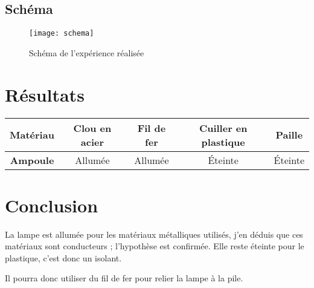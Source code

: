 \documentclass[11pt,a4paper]{article}
\begin{document}
	\subsection{Schéma}
	
		\begin{figure}[h!]
			\begin{center}
				\texttt{[image: schema]}
			\end{center}
			\caption{Schéma de l'expérience réalisée}
		\end{figure}
	
\section{Résultats}
	\begin{tabular}{|@{\ }c@{\ }|@{\ }c@{\ }|@{\ }c@{\ }|@{\ }c@{\ }|@{\ }c@{\ }|}
		\hline
		\textbf{Matériau} & Clou en acier & Fil de fer & Cuiller en plastique & Paille  \\ \hline
		\textbf{Ampoule}  & Allumée        & Allumée     & \'Eteinte              & \'Eteinte \\ \hline
	\end{tabular}

\section{Conclusion}

	La lampe est allumée pour les matériaux métalliques utilisés, j'en déduis que ces matériaux sont conducteurs ; l'hypothèse est confirmée. Elle reste éteinte pour le plastique, c'est donc un isolant. 
	
	Il pourra donc utiliser du fil de fer pour relier la lampe à la pile.

	
\end{document}
